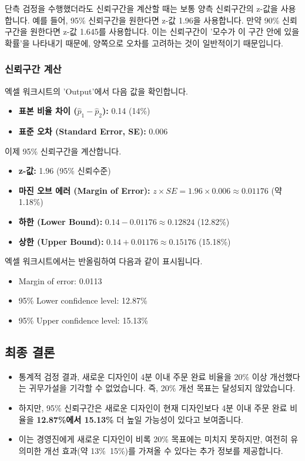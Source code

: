 \documentclass[11pt,a4paper]{book}
\theoremstyle{definition}
\begin{document}
\begin{cautionbox}[title=z-값 선택의 혼동 방지:]
단측 검정을 수행했더라도 신뢰구간을 계산할 때는 보통 양측 신뢰구간의 z-값을 사용합니다. 예를 들어, 95\% 신뢰구간을 원한다면 z-값 1.96을 사용합니다. 만약 90\% 신뢰구간을 원한다면 z-값 1.645를 사용합니다. 이는 신뢰구간이 '모수가 이 구간 안에 있을 확률'을 나타내기 때문에, 양쪽으로 오차를 고려하는 것이 일반적이기 때문입니다.
\end{cautionbox}

\subsubsection{신뢰구간 계산}
엑셀 워크시트의 'Output'에서 다음 값을 확인합니다.
\begin{itemize}
    \item \textbf{표본 비율 차이 ($\hat{p}_1 - \hat{p}_2$):} 0.14 (14\%)
    \item \textbf{표준 오차 (Standard Error, SE):} 0.006
\end{itemize}
이제 95\% 신뢰구간을 계산합니다.
\begin{itemize}
    \item \textbf{z-값:} 1.96 (95\% 신뢰수준)
    \item \textbf{마진 오브 에러 (Margin of Error):} $z \times SE = 1.96 \times 0.006 \approx 0.01176$ (약 1.18\%)
    \item \textbf{하한 (Lower Bound):} $0.14 - 0.01176 \approx 0.12824$ (12.82\%)
    \item \textbf{상한 (Upper Bound):} $0.14 + 0.01176 \approx 0.15176$ (15.18\%)
\end{itemize}
엑셀 워크시트에서는 반올림하여 다음과 같이 표시됩니다.
\begin{itemize}
    \item Margin of error: 0.0113
    \item 95\% Lower confidence level: 12.87\%
    \item 95\% Upper confidence level: 15.13\%
\end{itemize}

\subsection{최종 결론}

\begin{summarybox}[title=종합 결론:]
\begin{itemize}
    \item 통계적 검정 결과, 새로운 디자인이 4분 이내 주문 완료 비율을 20\% 이상 개선했다는 귀무가설을 기각할 수 없었습니다. 즉, 20\% 개선 목표는 달성되지 않았습니다.
    \item 하지만, 95\% 신뢰구간은 새로운 디자인이 현재 디자인보다 4분 이내 주문 완료 비율을 \textbf{12.87\%에서 15.13\%} 더 높일 가능성이 있다고 보여줍니다.
    \item 이는 경영진에게 새로운 디자인이 비록 20\% 목표에는 미치지 못하지만, 여전히 유의미한 개선 효과(약 13\%~15\%)를 가져올 수 있다는 추가 정보를 제공합니다.
\end{itemize}
\end{summarybox}
\end{document}
